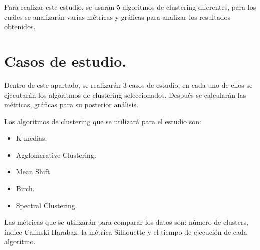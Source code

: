 	\vspace{0.06in}
	Para realizar este estudio, se usarán 5 algoritmos de clustering diferentes, para los cuáles se analizarán varias métricas y gráficas para analizar los resultados obtenidos.
	\section[Casos de estudio]{Casos de estudio.}
	Dentro de este apartado, se realizarán 3 casos de estudio, en cada uno de ellos se ejecutarán los algoritmos de clustering seleccionados. Después se calcularán las métricas, gráficas para su posterior análisis.
	
	Los algoritmos de clustering que se utilizará para el estudio son:
	\begin{itemize}
		\item K-medias.
		\item Agglomerative Clustering.
		\item Mean Shift.
		\item Birch.
		\item Spectral Clustering.
	\end{itemize}

	Las métricas que se utilizarán para comparar los datos son: número de clusters, índice Calinski-Harabaz, la métrica Silhouette y el tiempo de ejecución de cada algoritmo.
	
